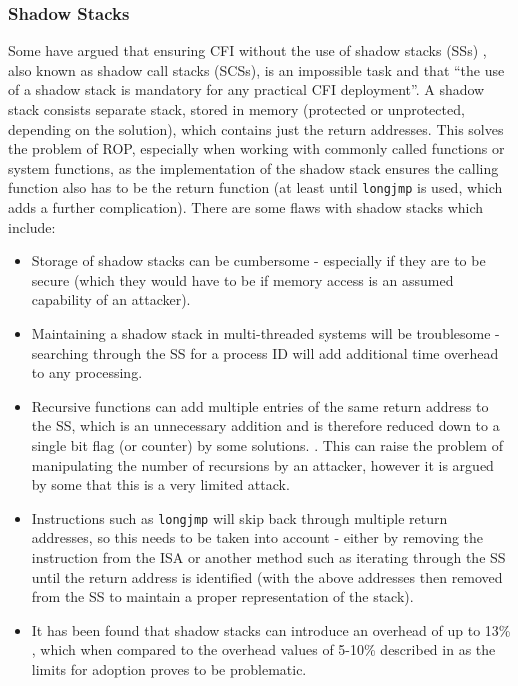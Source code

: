 \subsubsection*{Shadow Stacks}
Some have argued that ensuring CFI without the use of shadow stacks (SSs) \cite{Christoulakis2016}, also known as shadow call stacks (SCSs), is an impossible task and that ``the use of a shadow stack is mandatory for any practical CFI deployment''. A shadow stack consists separate stack, stored in memory (protected or unprotected, depending on the solution), which contains just the return addresses. This solves the problem of ROP, especially when working with commonly called functions or system functions, as the implementation of the shadow stack ensures the calling function also has to be the return function (at least until \verb|longjmp| is used, which adds a further complication). There are some flaws with shadow stacks which include:
\begin{itemize}
	\item Storage of shadow stacks can be cumbersome - especially if they are to be secure (which they would have to be if memory access is an assumed capability of an attacker).
	\item Maintaining a shadow stack in multi-threaded systems will be troublesome - searching through the SS for a process ID will add additional time overhead to any processing.
	\item Recursive functions can add multiple entries of the same return address to the SS, which is an unnecessary addition and is therefore reduced down to a single bit flag (or counter) by some solutions. \cite{Christoulakis2016}. This can raise the problem of manipulating the number of recursions by an attacker, however it is argued by some that this is a very limited attack.
	\item Instructions such as \verb|longjmp| will skip back through multiple return addresses, so this needs to be taken into account - either by removing the instruction from the ISA or another method such as iterating through the SS until the return address is identified (with the above addresses then removed from the SS to maintain a proper representation of the stack).
	\item It has been found that shadow stacks can introduce an overhead of up to 13\% \cite{Dang}, which when compared to the overhead values of 5-10\% described in \cite{Szekeres2013} as the limits for adoption proves to be problematic.
\end{itemize}

